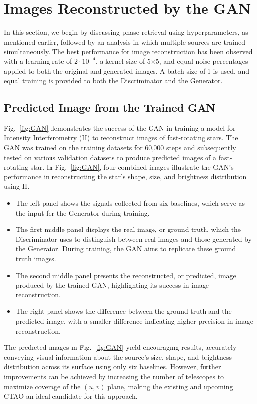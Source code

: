 \section{Images Reconstructed by the GAN}
In this section, we begin by discussing phase retrieval using hyperparameters, as mentioned earlier, followed by an analysis in which multiple sources are trained simultaneously. The best performance for image reconstruction has been observed with a learning rate of \(2 \cdot 10^{-4}\), a kernel size of 5×5, and equal noise percentages applied to both the original and generated images. A batch size of 1 is used, and equal training is provided to both the Discriminator and the Generator.

\subsection{Predicted Image from the Trained GAN}
Fig.~\ref{fig:GAN} demonstrates the success of the GAN in training a model for Intensity Interferometry (II) to reconstruct images of fast-rotating stars. The GAN was trained on the training datasets for 60,000 steps and subsequently tested on various validation datasets to produce predicted images of a fast-rotating star. In Fig.~\ref{fig:GAN}, four combined images illustrate the GAN's performance in reconstructing the star’s shape, size, and brightness distribution using II.
\begin{itemize}
\item{The left panel shows the signals collected from six baselines, which serve as the input for the Generator during training.}
\item{The first middle panel displays the real image, or ground truth, which the Discriminator uses to distinguish between real images and those generated by the Generator. During training, the GAN aims to replicate these ground truth images.}
\item{The second middle panel presents the reconstructed, or predicted, image produced by the trained GAN, highlighting its success in image reconstruction.}
\item{The right panel shows the difference between the ground truth and the predicted image, with a smaller difference indicating higher precision in image reconstruction.}
\end{itemize}
The predicted images in Fig.~\ref{fig:GAN} yield encouraging results, accurately conveying visual information about the source's size, shape, and brightness distribution across its surface using only six baselines. However, further improvements can be achieved by increasing the number of telescopes to maximize coverage of the $(u, v)$ plane, making the existing and upcoming CTAO an ideal candidate for this approach.

